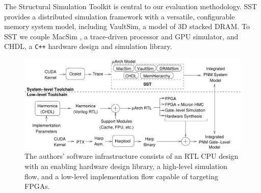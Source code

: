 The Structural Simulation Toolkit \cite{sst} is central to our evaluation methodology.
SST provides a distributed simulation framework with a versatile, configurable memory system model, including VaultSim, a model of 3D stacked DRAM.
To SST we couple MacSim \cite{macsim}, a trace-driven processor and GPU simulator, and CHDL, a \texttt{C++} hardware design and simulation library.

\begin{figure}[h!]
  \centering
  \includegraphics[width=6in]{fig/toolchain}
  \caption{The authors' software infrastructure consists of an RTL CPU design with an enabling hardware design library, a high-level simulation flow, and a low-level implementation flow capable of targeting FPGAs.}
  \label{fig:toolchain}
\end{figure}
